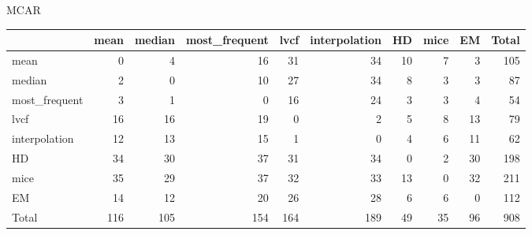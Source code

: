 \documentclass{article}
\begin{document}
{\large MCAR}
\begin{tabular}{lrrrrrrrrr}
\hline
               &   mean &   median &   most\_frequent &   lvcf &   interpolation &   HD &   mice &   EM &   Total \\
\hline
 mean          &      0 &        4 &              16 &     31 &              34 &   10 &      7 &    3 &     105 \\
 median        &      2 &        0 &              10 &     27 &              34 &    8 &      3 &    3 &      87 \\
 most\_frequent &      3 &        1 &               0 &     16 &              24 &    3 &      3 &    4 &      54 \\
 lvcf          &     16 &       16 &              19 &      0 &               2 &    5 &      8 &   13 &      79 \\
 interpolation &     12 &       13 &              15 &      1 &               0 &    4 &      6 &   11 &      62 \\
 HD            &     34 &       30 &              37 &     31 &              34 &    0 &      2 &   30 &     198 \\
 mice          &     35 &       29 &              37 &     32 &              33 &   13 &      0 &   32 &     211 \\
 EM            &     14 &       12 &              20 &     26 &              28 &    6 &      6 &    0 &     112 \\
 Total         &    116 &      105 &             154 &    164 &             189 &   49 &     35 &   96 &     908 \\
\hline
\end{tabular}
\vspace{.5cm}

\centering
\end{document}
